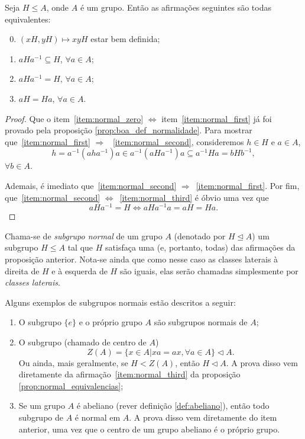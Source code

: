 \documentclass[11pt,openany]{book}
\begin{document}
\begin{proposition}
\label{prop:normal_equivalencias}
    Seja $H \leq A$, onde $A$ é um grupo. Então as afirmações seguintes são todas equivalentes:
    \begin{enumerate}
        \setcounter{enumi}{-1}
        \item $(xH, yH) \mapsto xyH$ estar bem definida; \label{item:normal_zero}
        \item $aHa^{-1} \subseteq H$, $\forall a \in A$; \label{item:normal_first}
        \item $aHa^{-1} = H$, $\forall a \in A$; \label{item:normal_second}
        \item $aH = Ha$, $\forall a \in A$. \label{item:normal_third}
    \end{enumerate}
\end{proposition}

\begin{proof}
     Que o item~\ref{item:normal_zero} $\Leftrightarrow$ item~\ref{item:normal_first} já foi provado pela proposição \ref{prop:boa_def_normalidade}. Para mostrar que~\ref{item:normal_first} $\Rightarrow$ ~\ref{item:normal_second}, consideremos $h \in H$ e $a \in A$,
    \[h = a^{-1}(aha^{-1})a \in a^{-1}(aHa^{-1})a \subseteq a^{-1}Ha = bHb^{-1},\]
    $\forall b \in A$.

    Ademais, é imediato que~\ref{item:normal_second} $\Rightarrow$~\ref{item:normal_first}. Por fim, que~\ref{item:normal_second} $\Leftrightarrow$~\ref{item:normal_third} é óbvio uma vez que
    \[aHa^{-1} = H \Leftrightarrow aHa^{-1}a = aH = Ha.\]
\end{proof}

\begin{definition}
\label{def:subgrupo_normal}
    Chama-se de \textit{subgrupo normal} de um grupo $A$ (denotado por $H \trianglelefteq A$) um subgrupo $H \leq A$ tal que $H$ satisfaça uma (e, portanto, todas) das afirmações da proposição anterior. Nota-se ainda que como nesse caso as classes laterais à direita de $H$ e à esquerda de $H$ são iguais, elas serão chamadas simplesmente por \textit{classes laterais}.
\end{definition}

Alguns exemplos de subgrupos normais estão descritos a seguir:
\begin{enumerate}[label=Exemplo \arabic*),align=left]
    \item O subgrupo $\{e\}$ e o próprio grupo $A$ são subgrupos normais de $A$;

    \item O subgrupo (chamado de centro de $A$) \[Z(A) = \{x \in A | xa = ax, \forall a \in A\} \triangleleft A.\] Ou ainda, mais geralmente, se $H < Z(A)$, então $H \triangleleft A$.
        A prova disso vem diretamente da afirmação~\ref{item:normal_third} da proposição \ref{prop:normal_equivalencias};

    \item Se um grupo $A$ é abeliano (rever definição \ref{def:abeliano}), então todo subgrupo de $A$ é normal em $A$.
        A prova disso vem diretamente do item anterior, uma vez que o centro de um grupo abeliano é o próprio grupo.
\end{enumerate}
\end{document}
